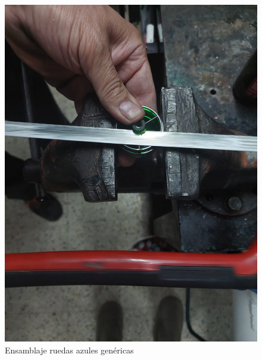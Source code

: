 \begin{figure}[ht!]
\begin{minipage}{0.45\linewidth}
		\includegraphics[width=\linewidth]{figs/cap5/creacionra2.jpeg}
		\caption*{\centering}
	\end{minipage}
	\caption{Ensamblaje ruedas azules genéricas}
	\label{fig:rae}
\end{figure}


